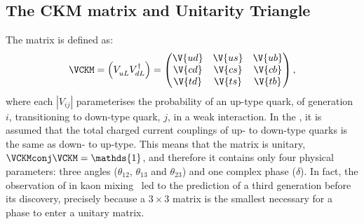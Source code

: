 \subsection{The CKM matrix and Unitarity Triangle}
\label{sec:ckm}

The \ckm matrix is defined as:
\begin{equation}
  \VCKM = \left(V_{uL}^{\phantom{\dagger}} V_{dL}^\dagger\right) =
  \begin{pmatrix}
    \V{ud} & \V{us} & \V{ub} \\
    \V{cd} & \V{cs} & \V{cb} \\
    \V{td} & \V{ts} & \V{tb} \\
  \end{pmatrix},
\end{equation}
where each $|V_{ij}|$ parameterises the probability of an up-type quark, of generation $i$,
transitioning to down-type quark, $j$, in a weak interaction.
In the \sm, it is assumed that the total charged current couplings of up- to down-type quarks is the
same as down- to up-type.
This means that the \ckm matrix is unitary, $\VCKMconj\VCKM = \mathds{1}$, and therefore it contains
only four physical parameters: three angles ($\theta_{12}$, $\theta_{13}$ and $\theta_{23}$) and one
complex phase ($\delta$).
In fact, the observation of \CPV in kaon mixing~\cite{Christenson:1964fg}
led to the prediction of a third generation before
its discovery, precisely because a $3\times3$ matrix is the smallest necessary for a phase to enter
a unitary matrix.




